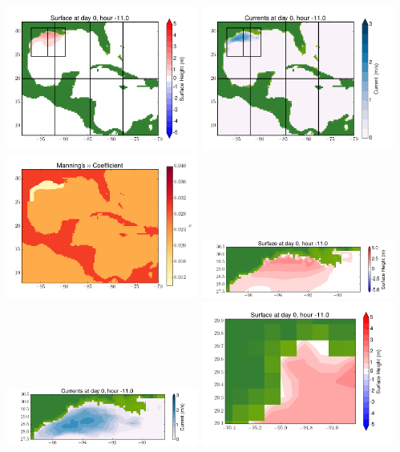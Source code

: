 \documentclass[11pt]{article}
\begin{document}
\vskip 10pt 
\includegraphics[width=0.475\textwidth]{frame0061fig1.png}
\includegraphics[width=0.475\textwidth]{frame0061fig2.png}
\vskip 10pt 
\includegraphics[width=0.475\textwidth]{frame0061fig3.png}
\includegraphics[width=0.475\textwidth]{frame0061fig4.png}
\vskip 10pt 
\includegraphics[width=0.475\textwidth]{frame0061fig5.png}
\includegraphics[width=0.475\textwidth]{frame0061fig6.png}
\end{document}
